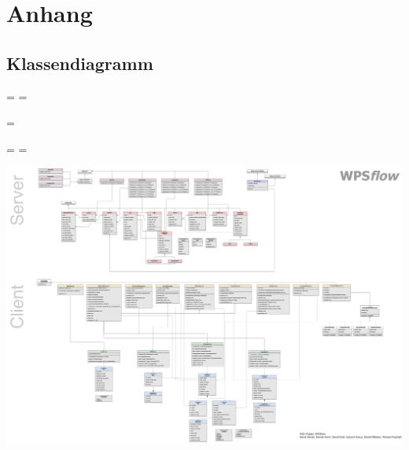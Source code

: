 \chapter{Anhang}

	\section{Klassendiagramm}
	
	
	
	\newpage
		
	\pdfpageheight
	\pdfpagewidth
	\pdfpageheight=\paperheight
	\pdfpagewidth=\paperwidth
	\textheight
	
	\begingroup 
	\vsize=\textwidth
	\textheight
	
	\textwidth=\hsize
	\textheight=\vsize
		
		
	\includegraphics[width=\pdfpagewidth-3cm]{diagrams/class-diagram-complete.jpg}
%		

